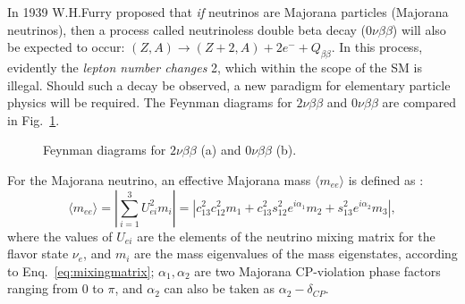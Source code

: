 In 1939 W.H.Furry \cite{furry1939transition} proposed that {\em if} neutrinos are Majorana particles (Majorana neutrinos), then a process called neutrinoless double beta decay ($0\nu\beta\beta$) will also be expected to occur: $(Z,A) \to (Z+2,A)+2e^{-}+Q_{\beta\beta}$. In this process, evidently the {\em lepton number changes} 2, which within the scope of the SM is illegal. Should such a decay be observed, a new paradigm for elementary particle physics will be required. The Feynman diagrams for $2\nu\beta\beta$ and $0\nu\beta\beta$ are compared in Fig.~\ref{fig:feynman}.
\begin{figure}[htbp]
	\centering
	{
		\caption[Feynman diagrams for $2\nu\beta\beta$ and $0\nu\beta\beta$.]{Feynman diagrams for $2\nu\beta\beta$ (a) and $0\nu\beta\beta$ (b).		\label{fig:feynman}}
	}
\end{figure}

For the Majorana neutrino, an effective Majorana mass $\langle m_{ee}\rangle$ is defined as \cite{suekane2015neutrino,zuber2020neutrino}:
\begin{equation}\label{eq:effective_nuMass}
\langle m_{ee}\rangle = |\sum_{i=1}^3 U^2_{ei}m_i|= |c^2_{13}c^2_{12}m_1+c^2_{13}s^2_{12}e^{i\alpha_1}m_2+s^2_{13}e^{i\alpha_2}m_3|,
\end{equation}
where the values of $U_{ei}$ are the elements of the neutrino mixing matrix for the flavor state $\nu_e$, and $m_i$ are the mass eigenvalues of the mass eigenstates, according to Enq.~\ref{eq:mixingmatrix}; $\alpha_1,\alpha_2$ are two Majorana CP-violation phase factors ranging from 0 to $\pi$, and $\alpha_2$ can also be taken as $\alpha_2-\delta_{CP}$.

